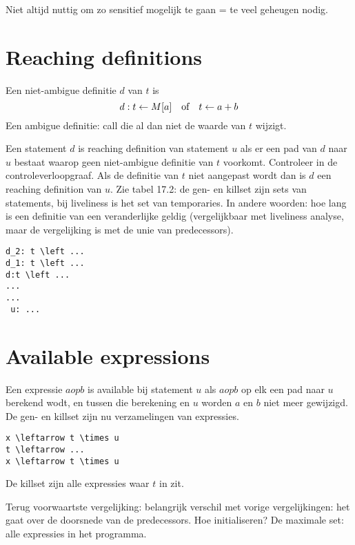 Niet altijd nuttig om zo sensitief mogelijk te gaan = te veel geheugen nodig.

\section{Reaching definitions}
Een niet-ambigue definitie $d$ van $t$ is
$$d: t \leftarrow M[a] \quad\hbox{of}\quad t \leftarrow a + b$$
Een ambigue definitie: call die al dan niet de waarde van $t$ wijzigt.

Een statement $d$ is reaching definition van statement $u$ als er een pad van $d$ naar $u$ bestaat waarop geen niet-ambigue definitie van $t$ voorkomt. Controleer in de controleverloopgraaf. Als de definitie van $t$ niet aangepast wordt dan is $d$ een reaching definition van $u$.  Zie tabel 17.2: de gen- en killset zijn sets van statements, bij liveliness is het set van temporaries. In andere woorden: hoe lang is een definitie van een veranderlijke geldig (vergelijkbaar met liveliness analyse, maar de vergelijking is met de unie van predecessors).
\begin{lstlisting}
d_2: t \left ...  
d_1: t \left ... 
d:t \left ... 
... 
... 
 u: ...
\end{lstlisting}



\section{Available expressions}
Een expressie $a op b$ is available bij statement $u$ als $a op b$ op elk een pad naar $u$ berekend wodt, en tussen die berekening en $u$ worden $a$ en $b$ niet meer gewijzigd.
De gen- en killset zijn nu verzamelingen van expressies. 
\begin{lstlisting}
x \leftarrow t \times u
t \leftarrow ...
x \leftarrow t \times u
\end{lstlisting}
De killset zijn alle expressies waar $t$ in zit.


Terug voorwaartste vergelijking: belangrijk verschil met vorige vergelijkingen: het gaat over de doorsnede van de predecessors. Hoe initialiseren? De maximale set: alle expressies in het programma.

